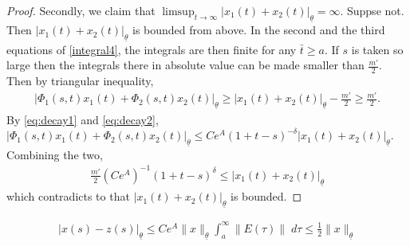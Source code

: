 \documentclass[a4paper,11pt]{article}
\newcommand{\tl}{{\underline{\theta}}}
\newcommand{\bt}{{\bar{t}}}
\theoremstyle{remark}
\begin{document}
\begin{proof}
Secondly, we claim that $ \displaystyle\limsup_{t \rightarrow \infty} |x_1(t) +x_2(t)|_\tl = \infty$. Suppse not. Then $ |x_1(t) +x_2(t)|_\tl$ is bounded from above. In the second and the third equations of \eqref{integral4}, the integrals are then finite for any $\bt\ge a$. If $s$ is taken so large then the integrals there in absolute value can be made smaller than $ \frac{m'}{2}$. Then by triangular inequality,
\begin{align*}
 |\Phi_1(s,t)x_1(t) + \Phi_2(s,t)x_2(t)|_\tl \ge |x_1(t) +x_2(t)|_\tl - \frac{m'}{2} \ge \frac{m'}{2}. 
\end{align*}
By \eqref{eq:decay1} and \eqref{eq:decay2}, $|\Phi_1(s,t)x_1(t) + \Phi_2(s,t)x_2(t)|_\tl \le Ce^A (1+t-s)^{-\delta} |x_1(t)+x_2(t)|_\tl$. Combining the two, 
\begin{align*}
 \frac{m'}{2}(Ce^A)^{-1}(1+t-s)^\delta \le |x_1(t)+x_2(t)|_\tl
\end{align*}
which contradicts to that $|x_1(t)+x_2(t)|_\tl$ is bounded.
\end{proof}
\begin{align*}
|x(s)-z(s)|_\tl \le C e^A \|x\|_\tl \int_a^\infty \|E(\tau)\| \;d\tau \le \frac{1}{2} \|x\|_\tl
\end{align*}
\end{document}
